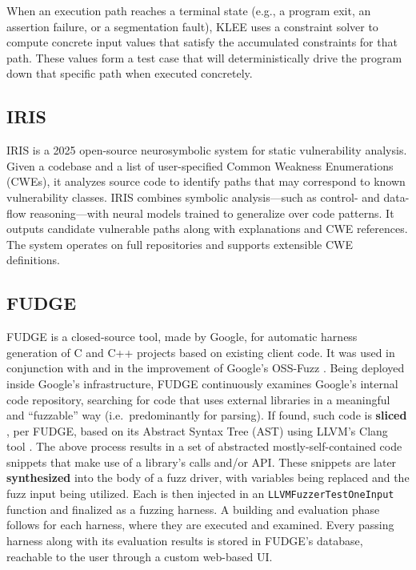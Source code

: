\documentclass[
  a4paper,
  DIV=11,
  numbers=noendperiod]{scrreprt}
\theoremstyle{definition}
\theoremstyle{remark}
\begin{document}
When an execution path reaches a terminal state (e.g., a program exit,
an assertion failure, or a segmentation fault), KLEE uses a constraint
solver to compute concrete input values that satisfy the accumulated
constraints for that path. These values form a test case that will
deterministically drive the program down that specific path when
executed concretely.

\subsection{IRIS}\label{iris}

IRIS \autocite{iris} is a 2025 open-source neurosymbolic system for
static vulnerability analysis. Given a codebase and a list of
user-specified Common Weakness Enumerations (CWEs), it analyzes source
code to identify paths that may correspond to known vulnerability
classes. IRIS combines symbolic analysis---such as control- and
data-flow reasoning---with neural models trained to generalize over code
patterns. It outputs candidate vulnerable paths along with explanations
and CWE references. The system operates on full repositories and
supports extensible CWE definitions.

\subsection{FUDGE}\label{fudge}

FUDGE \autocite{fudge} is a closed-source tool, made by Google, for
automatic harness generation of C and C++ projects based on existing
client code. It was used in conjunction with and in the improvement of
Google's OSS-Fuzz \autocite{oss-fuzz}. Being deployed inside Google's
infrastructure, FUDGE continuously examines Google's internal code
repository, searching for code that uses external libraries in a
meaningful and ``fuzzable'' way (i.e.~predominantly for parsing). If
found, such code is \textbf{sliced} \autocite{sasirekha2011Slicing}, per
FUDGE, based on its Abstract Syntax Tree (AST) using LLVM's Clang tool
\autocite{llvm}. The above process results in a set of abstracted
mostly-self-contained code snippets that make use of a library's calls
and/or API. These snippets are later \textbf{synthesized} into the body
of a fuzz driver, with variables being replaced and the fuzz input being
utilized. Each is then injected in an \texttt{LLVMFuzzerTestOneInput}
function and finalized as a fuzzing harness. A building and evaluation
phase follows for each harness, where they are executed and examined.
Every passing harness along with its evaluation results is stored in
FUDGE's database, reachable to the user through a custom web-based UI.
\end{document}
